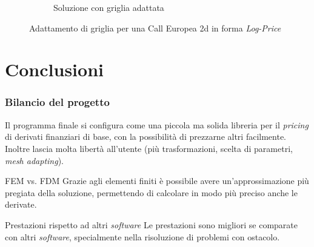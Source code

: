 \documentclass{beamer}
\begin{document}
\begin{frame}[c]
\begin{figure}
\begin{subfigure}{0.48\linewidth}
{  \caption{Soluzione con griglia adattata}}
 \end{subfigure}
 \caption{Adattamento di griglia per una Call Europea 2d in forma \emph{Log-Price}}
 \end{figure}
\end{frame}


\section{Conclusioni}

\begin{frame}
 \frametitle{Bilancio del progetto}
Il programma finale si configura come una piccola ma solida libreria per il \emph{pricing} di derivati finanziari di base, con la possibilit\`a di prezzarne altri facilmente. Inoltre lascia molta libertà all'utente (più trasformazioni, scelta di parametri, \emph{mesh adapting}).
\vspace{0.4cm}
\begin{block}{FEM vs. FDM}
Grazie agli elementi finiti \`e possibile avere un'approssimazione pi\`u pregiata della soluzione, permettendo di calcolare in modo pi\`u preciso anche le derivate.\\
\end{block}
\vspace{0.4cm}
\begin{block}{Prestazioni rispetto ad altri \emph{software}}
Le prestazioni sono migliori se comparate con altri \emph{software}, specialmente nella risoluzione di problemi con ostacolo.
\end{block}
\end{frame}

\end{document}

